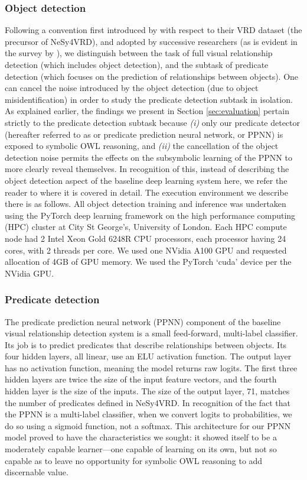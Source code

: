\documentclass[]{jair}
\begin{document}
\subsubsection{Object detection}
Following a convention first introduced by \citet{lu2016visual} with respect to their VRD dataset (the precursor of NeSy4VRD), and adopted by successive researchers (as is evident in the survey by \citet{DBLP:journals/corr/abs-2201-00443}), we distinguish between the task of full visual relationship detection (which includes object detection), and the subtask of predicate detection (which focuses on the prediction of relationships between objects).
One can cancel the noise introduced by the object detection (due to object misidentification) in order to study the predicate detection subtask in isolation. 
As explained earlier, the findings we present in Section \ref{sec:evaluation} pertain strictly to the predicate detection subtask because \textit{(i)} only our predicate detector (hereafter referred to as or predicate prediction neural network, or PPNN) is exposed to symbolic OWL reasoning, and \textit{(ii)} the cancellation of the object detection noise permits the effects on the subsymbolic learning of the PPNN to more clearly reveal themselves.
In recognition of this, instead of describing the object detection aspect of the baseline deep learning system here, we refer the reader to \citet{HerronThesis2025} where it is covered in detail.
The execution environment we describe there is as follows.
All object detection training and inference was undertaken using the PyTorch deep learning framework on the high performance computing (HPC) cluster at City St George's, University of London.
Each HPC compute node had 2 Intel Xeon Gold 6248R CPU processors, each processor having 24 cores, with 2 threads per core.
We used one NVidia A100 GPU and requested allocation of 4GB of GPU memory.
We used the PyTorch `cuda' device per the NVidia GPU.

\subsubsection{Predicate detection}
The predicate prediction neural network (PPNN) component of the baseline visual relationship detection system is a small feed-forward, multi-label classifier.
Its job is to predict predicates that describe relationships between objects.
Its four hidden layers, all linear, use an ELU activation function.
The output layer has no activation function, meaning the model returns raw logits.
The first three hidden layers are twice the size of the input feature vectors, and the fourth hidden layer is the size of the inputs.
The size of the output layer, 71, matches the number of predicates defined in NeSy4VRD.
In recognition of the fact that the PPNN is a multi-label classifier, when we convert logits to probabilities, we do so using a sigmoid function, not a softmax.
This architecture for our PPNN model proved to have the characteristics we sought: it showed itself to be a moderately capable learner---one capable of learning on its own, but not so capable as to leave no opportunity for symbolic OWL reasoning to add discernable value.
\end{document}
